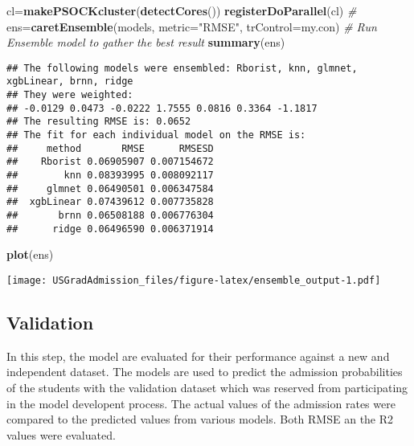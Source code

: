 \documentclass[11pt,]{article}
\newenvironment{Shaded}{\begin{snugshade}}{\end{snugshade}}
\newcommand{\CommentTok}[1]{\textcolor[rgb]{0.56,0.35,0.01}{\textit{#1}}}
\newcommand{\DataTypeTok}[1]{\textcolor[rgb]{0.13,0.29,0.53}{#1}}
\newcommand{\KeywordTok}[1]{\textcolor[rgb]{0.13,0.29,0.53}{\textbf{#1}}}
\newcommand{\NormalTok}[1]{#1}
\newcommand{\StringTok}[1]{\textcolor[rgb]{0.31,0.60,0.02}{#1}}
\begin{document}
\begin{Shaded}
\begin{Highlighting}[]
\NormalTok{cl=}\KeywordTok{makePSOCKcluster}\NormalTok{(}\KeywordTok{detectCores}\NormalTok{())}
\KeywordTok{registerDoParallel}\NormalTok{(cl)}
\CommentTok{# }
\NormalTok{ens=}\KeywordTok{caretEnsemble}\NormalTok{(models, }\DataTypeTok{metric=}\StringTok{"RMSE"}\NormalTok{, }
                  \DataTypeTok{trControl=}\NormalTok{my.con) }\CommentTok{# Run Ensemble model to gather the best result}
\KeywordTok{summary}\NormalTok{(ens)}
\end{Highlighting}
\end{Shaded}

\begin{verbatim}
## The following models were ensembled: Rborist, knn, glmnet, xgbLinear, brnn, ridge 
## They were weighted: 
## -0.0129 0.0473 -0.0222 1.7555 0.0816 0.3364 -1.1817
## The resulting RMSE is: 0.0652
## The fit for each individual model on the RMSE is: 
##     method       RMSE      RMSESD
##    Rborist 0.06905907 0.007154672
##        knn 0.08393995 0.008092117
##     glmnet 0.06490501 0.006347584
##  xgbLinear 0.07439612 0.007735828
##       brnn 0.06508188 0.006776304
##      ridge 0.06496590 0.006371914
\end{verbatim}

\begin{Shaded}
\begin{Highlighting}[]
\KeywordTok{plot}\NormalTok{(ens)}
\end{Highlighting}
\end{Shaded}

\texttt{[image: USGradAdmission\_files/figure-latex/ensemble\_output-1.pdf]}

\hypertarget{validation}{%
\subsection{Validation}\label{validation}}

In this step, the model are evaluated for their performance against a
new and independent dataset. The models are used to predict the
admission probabilities of the students with the validation dataset
which was reserved from participating in the model developent process.
The actual values of the admission rates were compared to the predicted
values from various models. Both RMSE an the R2 values were evaluated.
\end{document}
